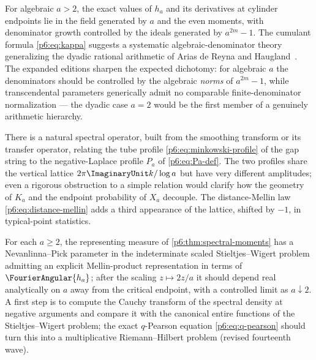 \documentclass[11pt,oneside]{article}
\numberwithin{equation}{section}
\theoremstyle{definition}
\theoremstyle{remark}
\begin{document}
\begin{conjecture}
For algebraic $a>2$, the exact values of $h_a$ and its derivatives at cylinder
endpoints lie in the field generated by $a$ and the even moments, with
denominator growth controlled by the ideals generated by $a^{2m}-1$.  The
cumulant formula \eqref{p6:eq:kappa} suggests a systematic
algebraic-denominator theory generalizing the dyadic rational arithmetic of
Arias de Reyna and Haugland~\cite{p6:arias-arithmetic,p6:haugland}.  The
expanded editions sharpen the expected dichotomy: for algebraic $a$ the
denominators should be controlled by the algebraic \emph{norms} of
$a^{2m}-1$, while transcendental parameters generically admit no
comparable finite-denominator normalization --- the dyadic case $a=2$
would be the first member of a genuinely arithmetic hierarchy.
\end{conjecture}

\begin{conjecture}
There is a natural spectral operator, built from the smoothing transform or
its transfer operator, relating the tube profile
\eqref{p6:eq:minkowski-profile} of the gap string to the negative-Laplace
profile $P_a$ of \eqref{p6:eq:Pa-def}.  The two profiles share the vertical
lattice $2\pi\ImaginaryUnit k/\log a$ but have very different amplitudes; even a rigorous
obstruction to a simple relation would clarify how the geometry of $K_a$ and
the endpoint probability of $X_a$ decouple.  The distance-Mellin law
\eqref{p6:eq:distance-mellin} adds a third appearance of the lattice, shifted
by $-1$, in typical-point statistics.
\end{conjecture}

\begin{conjecture}
For each $a\ge2$, the representing measure of
\cref{p6:thm:spectral-moments} has a Nevanlinna--Pick parameter in the
indeterminate scaled Stieltjes--Wigert problem admitting an explicit
Mellin-product representation in terms of $\FourierAngular{h_a}$; after the scaling
$z\mapsto2z/a$ it should depend real analytically on $a$ away from the
critical endpoint, with a controlled limit as $a\downarrow2$.  A first step
is to compute the Cauchy transform of the spectral density at negative
arguments and compare it with the canonical entire functions of the
Stieltjes--Wigert problem; the exact $q$-Pearson equation
\eqref{p6:eq:q-pearson} should turn this into a multiplicative
Riemann--Hilbert problem (revised fourteenth wave).
\end{conjecture}
\end{document}
